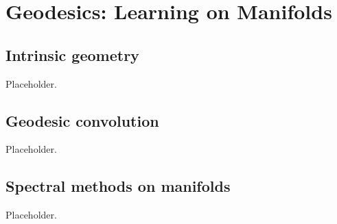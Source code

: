 \chapter{Geodesics: Learning on Manifolds}
\label{ch:geodesics}

\section{Intrinsic geometry}
Placeholder.

\section{Geodesic convolution}
Placeholder.

\section{Spectral methods on manifolds}
Placeholder.
